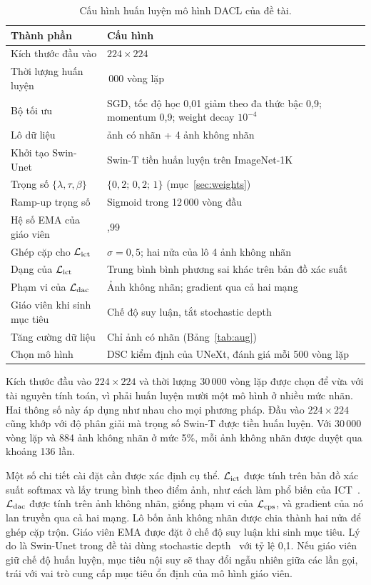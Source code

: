 \begin{table}[ht]
\centering
\caption{Cấu hình huấn luyện mô hình DACL của đề tài.}
\label{tab:dacl-config}
\small
\begin{tabularx}{\textwidth}{>{\raggedright\arraybackslash}p{4.4cm} >{\raggedright\arraybackslash}X}
\toprule
Thành phần & Cấu hình \\
\midrule
Kích thước đầu vào & $224\times224$ \\
Thời lượng huấn luyện & 30\,000 vòng lặp \\
Bộ tối ưu & SGD, tốc độ học 0,01 giảm theo đa thức bậc 0,9; momentum 0,9; weight decay $10^{-4}$ \\
Lô dữ liệu & 1 ảnh có nhãn + 4 ảnh không nhãn \\
Khởi tạo Swin-Unet & Swin-T tiền huấn luyện trên ImageNet-1K \\
Trọng số $\{\lambda,\tau,\beta\}$ & $\{0{,}2;\,0{,}2;\,1\}$ (mục~\ref{sec:weights}) \\
Ramp-up trọng số & Sigmoid trong 12\,000 vòng đầu \\
Hệ số EMA của giáo viên & 0,99 \\
Ghép cặp cho $\mathcal{L}_{\mathrm{ict}}$ & $\sigma=0{,}5$; hai nửa của lô 4 ảnh không nhãn \\
Dạng của $\mathcal{L}_{\mathrm{ict}}$ & Trung bình bình phương sai khác trên bản đồ xác suất \\
Phạm vi của $\mathcal{L}_{\mathrm{dac}}$ & Ảnh không nhãn; gradient qua cả hai mạng \\
Giáo viên khi sinh mục tiêu & Chế độ suy luận, tắt stochastic depth \\
Tăng cường dữ liệu & Chỉ ảnh có nhãn (Bảng~\ref{tab:aug}) \\
Chọn mô hình & DSC kiểm định của UNeXt, đánh giá mỗi 500 vòng lặp \\
\bottomrule
\end{tabularx}
\end{table}

Kích thước đầu vào $224\times224$ và thời lượng 30\,000 vòng lặp được chọn để vừa với tài nguyên tính toán, vì phải huấn luyện mười một mô hình ở nhiều mức nhãn. Hai thông số này áp dụng như nhau cho mọi phương pháp. Đầu vào $224\times224$ cũng khớp với độ phân giải mà trọng số Swin-T được tiền huấn luyện. Với 30\,000 vòng lặp và 884 ảnh không nhãn ở mức 5\%, mỗi ảnh không nhãn được duyệt qua khoảng 136 lần.

Một số chi tiết cài đặt cần được xác định cụ thể. $\mathcal{L}_{\mathrm{ict}}$ được tính trên bản đồ xác suất softmax và lấy trung bình theo điểm ảnh, như cách làm phổ biến của ICT~\cite{verma2022ict}. $\mathcal{L}_{\mathrm{dac}}$ được tính trên ảnh không nhãn, giống phạm vi của $\mathcal{L}_{\mathrm{cps}}$, và gradient của nó lan truyền qua cả hai mạng. Lô bốn ảnh không nhãn được chia thành hai nửa để ghép cặp trộn. Giáo viên EMA được đặt ở chế độ suy luận khi sinh mục tiêu. Lý do là Swin-Unet trong đề tài dùng stochastic depth~\cite{huang2016stochdepth} với tỷ lệ 0,1. Nếu giáo viên giữ chế độ huấn luyện, mục tiêu nội suy sẽ thay đổi ngẫu nhiên giữa các lần gọi, trái với vai trò cung cấp mục tiêu ổn định của mô hình giáo viên.

